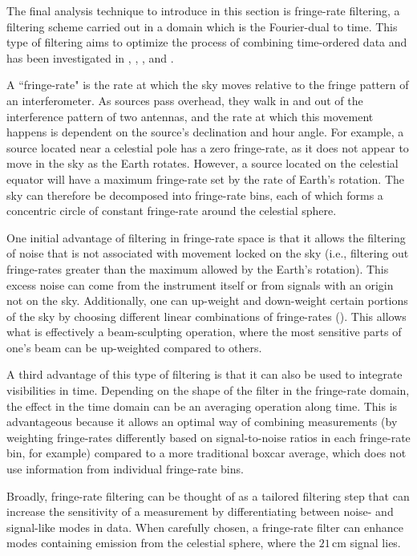 The final analysis technique to introduce in this section is fringe-rate filtering, a filtering scheme carried out in a domain which is the Fourier-dual to time. This type of filtering aims to optimize the process of combining time-ordered data and has been investigated in \citet{roshi_perley2003}, \citet{parsons_backer2009}, \citet{offringa_et_al2012}, and \citet{parsons_et_al2016}.

A ``fringe-rate" is the rate at which the sky moves relative to the fringe pattern of an interferometer. As sources pass overhead, they walk in and out of the interference pattern of two antennas, and the rate at which this movement happens is dependent on the source's declination and hour angle. For example, a source located near a celestial pole has a zero fringe-rate, as it does not appear to move in the sky as the Earth rotates. However, a source located on the celestial equator will have a maximum fringe-rate set by the rate of Earth's rotation. The sky can therefore be decomposed into fringe-rate bins, each of which forms a concentric circle of constant fringe-rate around the celestial sphere.

One initial advantage of filtering in fringe-rate space is that it allows the filtering of noise that is not associated with movement locked on the sky (i.e., filtering out fringe-rates greater than the maximum allowed by the Earth's rotation). This excess noise can come from the instrument itself or from signals with an origin not on the sky. Additionally, one can up-weight and down-weight certain portions of the sky by choosing different linear combinations of fringe-rates (\citealt{parsons_et_al2016}). This allows what is effectively a beam-sculpting operation, where the most sensitive parts of one's beam can be up-weighted compared to others.

A third advantage of this type of filtering is that it can also be used to integrate visibilities in time. Depending on the shape of the filter in the fringe-rate domain, the effect in the time domain can be an averaging operation along time. This is advantageous because it allows an optimal way of combining measurements (by weighting fringe-rates differently based on signal-to-noise ratios in each fringe-rate bin, for example) compared to a more traditional boxcar average, which does not use information from individual fringe-rate bins.

Broadly, fringe-rate filtering can be thought of as a tailored filtering step that can increase the sensitivity of a measurement by differentiating between noise- and signal-like modes in data. When carefully chosen, a fringe-rate filter can enhance modes containing emission from the celestial sphere, where the $21$\,cm signal lies.

